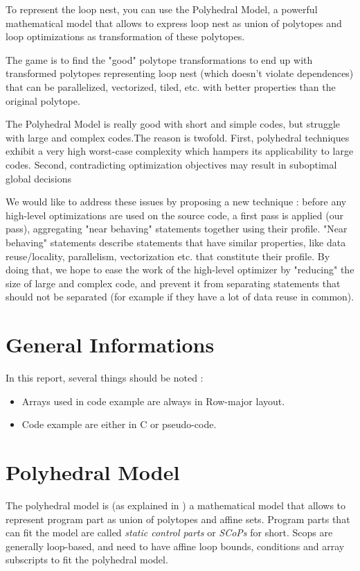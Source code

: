 \documentclass[paper=a4, fontsize=11pt]{scrartcl}
\numberwithin{equation}{section}        %
\numberwithin{figure}{section}          %
\numberwithin{table}{section}               %
\begin{document}
To represent the loop nest, you can use the Polyhedral Model, a powerful mathematical model
that allows to express loop nest as union of polytopes and loop optimizations as
transformation of these polytopes.

The game is to find the "good" polytope transformations to end up with
transformed polytopes representing loop nest (which doesn't violate dependences) 
that can be parallelized, vectorized, tiled, etc. with better properties than the original
polytope.

The Polyhedral Model is really good with short and simple codes, but struggle with
large and complex codes.The reason is twofold. First, polyhedral techniques exhibit
a very high worst-case complexity which hampers its applicability to large codes.
Second, contradicting optimization objectives may result in suboptimal global
decisions


We would like to address these issues by proposing a new technique : before any
high-level optimizations are used on the source code, a first pass is applied (our pass),
aggregating "near behaving" statements together using their profile.
"Near behaving" statements describe statements that have similar properties,
like data reuse/locality, parallelism, vectorization etc. that constitute their profile.
By doing that, we hope to ease the work of the high-level optimizer by "reducing" the size
of large and complex code, and prevent it from separating statements that should
not be separated (for example if they have a lot of data reuse in common).

\section{General Informations}

    In this report, several things should be noted :
    \begin{itemize}
        \item Arrays used in code example are always in Row-major layout.
        \item Code example are either in C or pseudo-code.
    \end{itemize}

\section{Polyhedral Model}
The polyhedral model is (as explained in \cite{Bas'12}) a mathematical model that allows to represent program
part as union of polytopes and affine sets. Program parts that can fit the model
are called \textit{static control parts} or \textit{SCoPs} for short.
Scops are generally loop-based, and need to have affine loop bounds, conditions and
array subscripts to fit the polyhedral model.
\end{document}

